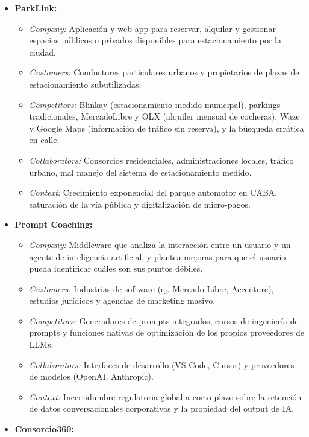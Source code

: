 \begin{itemize}
    \item \textbf{ParkLink:}
    \begin{itemize}
        \item \textit{Company:} Aplicación y web app para reservar, alquilar y gestionar espacios públicos o privados disponibles para estacionamiento por la ciudad.
        \item \textit{Customers:} Conductores particulares urbanos y propietarios de plazas de estacionamiento subutilizadas.
        \item \textit{Competitors:} Blinkay (estacionamiento medido municipal),
        parkings tradicionales, MercadoLibre y OLX (alquiler mensual de cocheras),
        Waze y Google Maps (información de tráfico sin reserva), y la búsqueda
        errática en calle.
        \item \textit{Collaborators:} Consorcios residenciales, administraciones locales, tráfico urbano, mal manejo del sistema de estacionamiento medido.
        \item \textit{Context:} Crecimiento exponencial del parque automotor en CABA, saturación de la vía pública y digitalización de micro-pagos.
    \end{itemize}
    \item \textbf{Prompt Coaching:}
    \begin{itemize}
        \item \textit{Company:} Middleware que analiza la interacción entre un usuario y un agente de inteligencia artificial, y plantea mejoras para que el usuario pueda identificar cuáles son sus puntos débiles.
        \item \textit{Customers:} Industrias de software (ej. Mercado Libre, Accenture), estudios jurídicos y agencias de marketing masivo.
        \item \textit{Competitors:} Generadores de prompts integrados, cursos de ingeniería de prompts y funciones nativas de optimización de los propios proveedores de LLMs.
        \item \textit{Collaborators:} Interfaces de desarrollo (VS Code, Cursor) y proveedores de modelos (OpenAI, Anthropic).
        \item \textit{Context:} Incertidumbre regulatoria global a corto plazo sobre la retención de datos conversacionales corporativos y la propiedad del output de IA.
    \end{itemize}
    \item \textbf{Consorcio360:}

\end{itemize}
